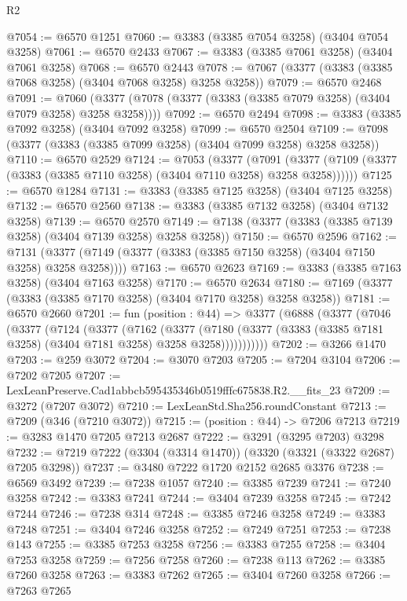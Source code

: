 \begin{lexlean}{R2}
\begin{coremodule}
@7054 := @6570 @1251
@7060 := @3383 (@3385 @7054 @3258) (@3404 @7054 @3258)
@7061 := @6570 @2433
@7067 := @3383 (@3385 @7061 @3258) (@3404 @7061 @3258)
@7068 := @6570 @2443
@7078 := @7067 (@3377 (@3383 (@3385 @7068 @3258) (@3404 @7068 @3258) @3258 @3258))
@7079 := @6570 @2468
@7091 := @7060 (@3377 (@7078 (@3377 (@3383 (@3385 @7079 @3258) (@3404 @7079 @3258) @3258 @3258))))
@7092 := @6570 @2494
@7098 := @3383 (@3385 @7092 @3258) (@3404 @7092 @3258)
@7099 := @6570 @2504
@7109 := @7098 (@3377 (@3383 (@3385 @7099 @3258) (@3404 @7099 @3258) @3258 @3258))
@7110 := @6570 @2529
@7124 := @7053
    (@3377
      (@7091 (@3377 (@7109 (@3377 (@3383 (@3385 @7110 @3258) (@3404 @7110 @3258) @3258 @3258))))))
@7125 := @6570 @1284
@7131 := @3383 (@3385 @7125 @3258) (@3404 @7125 @3258)
@7132 := @6570 @2560
@7138 := @3383 (@3385 @7132 @3258) (@3404 @7132 @3258)
@7139 := @6570 @2570
@7149 := @7138 (@3377 (@3383 (@3385 @7139 @3258) (@3404 @7139 @3258) @3258 @3258))
@7150 := @6570 @2596
@7162 := @7131 (@3377 (@7149 (@3377 (@3383 (@3385 @7150 @3258) (@3404 @7150 @3258) @3258 @3258))))
@7163 := @6570 @2623
@7169 := @3383 (@3385 @7163 @3258) (@3404 @7163 @3258)
@7170 := @6570 @2634
@7180 := @7169 (@3377 (@3383 (@3385 @7170 @3258) (@3404 @7170 @3258) @3258 @3258))
@7181 := @6570 @2660
@7201 := fun (position : @44) =>
  @3377
    (@6888
      (@3377
        (@7046
          (@3377
            (@7124
              (@3377
                (@7162
                  (@3377
                    (@7180
                      (@3377 (@3383 (@3385 @7181 @3258) (@3404 @7181 @3258) @3258 @3258)))))))))))
@7202 := @3266 @1470
@7203 := @259 @3072
@7204 := @3070 @7203
@7205 := @7204 @3104
@7206 := @7202 @7205
@7207 := LexLeanPreserve.Cad1abbcb595435346b0519fffc675838.R2.__fits_23
@7209 := @3272 (@7207 @3072)
@7210 := LexLeanStd.Sha256.roundConstant
@7213 := @7209 (@346 (@7210 @3072))
@7215 := (position : @44) -> @7206 @7213
@7219 := @3283 @1470 @7205 @7213 @2687
@7222 := @3291 (@3295 @7203) @3298
@7232 := @7219 @7222 (@3304 (@3314 @1470)) (@3320 (@3321 (@3322 @2687) @7205 @3298))
@7237 := @3480 @7222 @1720 @2152 @2685 @3376
@7238 := @6569 @3492
@7239 := @7238 @1057
@7240 := @3385 @7239
@7241 := @7240 @3258
@7242 := @3383 @7241
@7244 := @3404 @7239 @3258
@7245 := @7242 @7244
@7246 := @7238 @314
@7248 := @3385 @7246 @3258
@7249 := @3383 @7248
@7251 := @3404 @7246 @3258
@7252 := @7249 @7251
@7253 := @7238 @143
@7255 := @3385 @7253 @3258
@7256 := @3383 @7255
@7258 := @3404 @7253 @3258
@7259 := @7256 @7258
@7260 := @7238 @113
@7262 := @3385 @7260 @3258
@7263 := @3383 @7262
@7265 := @3404 @7260 @3258
@7266 := @7263 @7265

\end{coremodule}
\end{lexlean}
